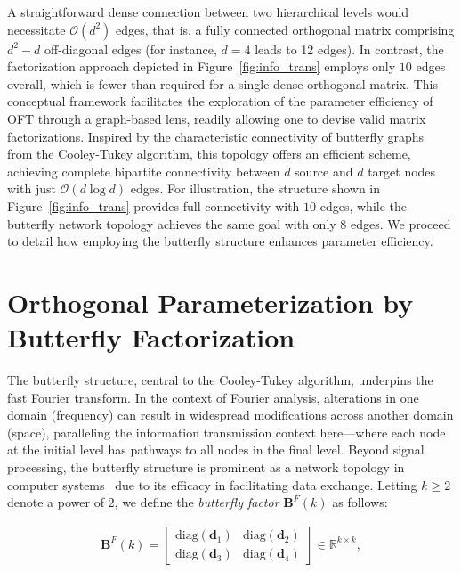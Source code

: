 A straightforward dense connection between two hierarchical levels would necessitate $\mathcal{O}(d^2)$ edges, that is, a fully connected orthogonal matrix comprising $d^2-d$ off-diagonal edges (for instance, $d=4$ leads to 12 edges). In contrast, the factorization approach depicted in Figure~\ref{fig:info_trans} employs only $10$ edges overall, which is fewer than required for a single dense orthogonal matrix. This conceptual framework facilitates the exploration of the parameter efficiency of OFT through a graph-based lens, readily allowing one to devise valid matrix factorizations. Inspired by the characteristic connectivity of butterfly graphs~\cite{cooley1965algorithm} from the Cooley-Tukey algorithm, this topology offers an efficient scheme, achieving complete bipartite connectivity between $d$ source and $d$ target nodes with just $\mathcal{O}(d\log d)$ edges. For illustration, the structure shown in Figure~\ref{fig:info_trans} provides full connectivity with $10$ edges, while the butterfly network topology achieves the same goal with only $8$ edges. We proceed to detail how employing the butterfly structure enhances parameter efficiency.

\section{Orthogonal Parameterization by Butterfly Factorization}

The butterfly structure, central to the Cooley-Tukey algorithm, underpins the fast Fourier transform. In the context of Fourier analysis, alterations in one domain (frequency) can result in widespread modifications across another domain (space), paralleling the information transmission context here—where each node at the initial level has pathways to all nodes in the final level. Beyond signal processing, the butterfly structure is prominent as a network topology in computer systems~\cite{solihin2015fundamentals,li2011linear} due to its efficacy in facilitating data exchange. Letting $k \geq 2$ denote a power of $2$, we define the \emph{butterfly factor} $\bm{B}^F(k)$ as follows:

\begin{equation}\label{eq:but_factor}
\begin{aligned}
    \bm{B}^F(k)=\begin{bmatrix}
    \text{diag}(\bm{d}_1) & \text{diag}(\bm{d}_2) \\
    \text{diag}(\bm{d}_3) & \text{diag}(\bm{d}_4)
    \end{bmatrix}\in\mathbb{R}^{k\times k},
\end{aligned}
\end{equation}

